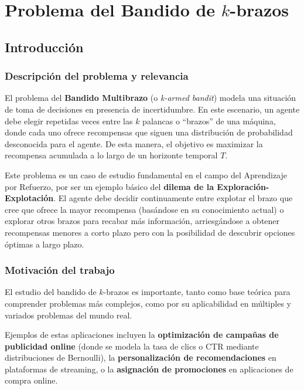 \chapter{Problema del Bandido de $k$-brazos}

\section{Introducción}

\subsection{Descripción del problema y relevancia}
El problema del \textbf{Bandido Multibrazo} (o \textit{k-armed bandit}) modela una situación 
de toma de decisiones en presencia de incertidumbre. En este escenario, 
un agente debe elegir repetidas veces entre las $k$ palancas o ``brazos'' de una máquina, donde cada uno ofrece recompensas 
que siguen una distribución de probabilidad desconocida para el agente. 
De esta manera, el objetivo es maximizar la recompensa acumulada a lo largo de un horizonte temporal $T$.

Este problema es un caso de estudio fundamental en el campo del Aprendizaje por Refuerzo, 
por ser un ejemplo básico del \textbf{dilema de la Exploración-Explotación}.
El agente debe decidir continuamente entre explotar el brazo que cree que ofrece 
la mayor recompensa (basándose en su conocimiento actual) o explorar otros brazos 
para recabar más información, arriesgándose a obtener recompensas menores a corto plazo pero 
con la posibilidad de descubrir opciones óptimas a largo plazo.

\subsection{Motivación del trabajo}
El estudio del bandido de $k$-brazos es importante, tanto como base teórica para comprender 
problemas más complejos, como por su aplicabilidad en múltiples y variados problemas del mundo real.

Ejemplos de estas aplicaciones incluyen 
la \textbf{optimización de campañas de publicidad online} (donde se modela la tasa de clics 
o CTR mediante distribuciones de Bernoulli), la \textbf{personalización de recomendaciones} 
en plataformas de streaming, o la \textbf{asignación de promociones} en aplicaciones de compra online.
 
